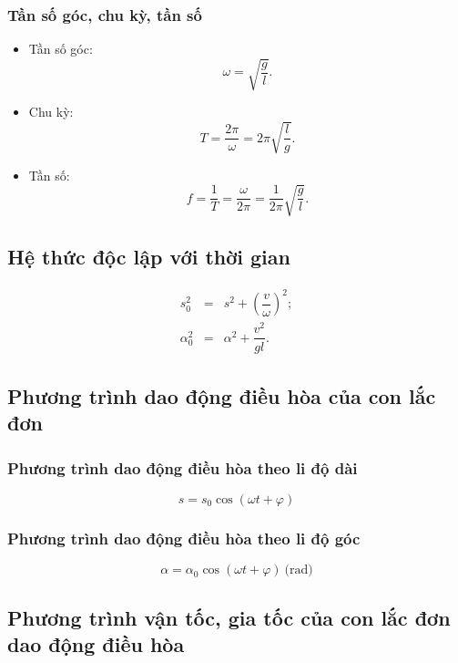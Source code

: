 \subsubsection{Tần số góc, chu kỳ, tần số}
\begin{itemize}
	\item Tần số góc:
	\begin{equation*}
		\omega =\sqrt{\dfrac{g}{l}}.
	\end{equation*}
	\item Chu kỳ:
	\begin{equation*} T=\dfrac{2\pi}{\omega}=2\pi\sqrt{\dfrac{l}{g}}.
	\end{equation*}
	\item Tần số:
	\begin{equation*} f=\dfrac{1}{T}=\dfrac{\omega}{2\pi}=\dfrac{1}{2\pi}\sqrt{\dfrac{g}{l}}.
	\end{equation*}
\end{itemize}
\subsection{Hệ thức độc lập với thời gian}
\begin{eqnarray*}
	s^2_0 &=&s^2+\left(\dfrac{v}{\omega}\right)^2; \\ \alpha^2_0 &=& \alpha^2 +\dfrac{v^2}{gl}.
\end{eqnarray*}
\subsection{Phương trình dao động điều hòa của con lắc đơn}
\subsubsection{Phương trình dao động điều hòa theo li độ dài}
\begin{equation*}
	s=s_0 \cos(\omega t + \varphi)
\end{equation*}
\subsubsection{Phương trình dao động điều hòa theo li độ góc}
\begin{equation*}
	\alpha =\alpha_0 \cos (\omega t + \varphi)\ \text{(rad)}
\end{equation*}


\subsection{Phương trình vận tốc, gia tốc của con lắc đơn dao động điều hòa}
